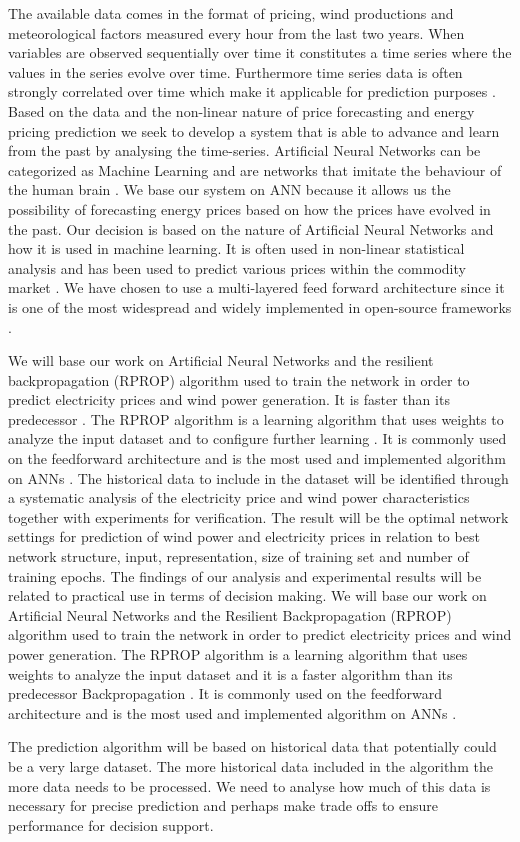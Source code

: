 The available data comes in the format of pricing, wind productions and meteorological factors measured every hour from the last two years. When variables are observed sequentially over time it constitutes a time series where the values in the series evolve over time. Furthermore time series data is often strongly correlated over time which make it applicable for prediction purposes \cite[Chapter~7.1.2]{econometrics}. Based on the data and the non-linear nature of price forecasting and energy pricing prediction we seek to develop a system that is able to advance and learn from the past by analysing the time-series. Artificial Neural Networks can be categorized as Machine Learning \cite{18} and are networks that imitate the behaviour of the human brain \cite{1}. We base our system on ANN because it allows us the possibility of forecasting energy prices based on how the prices have evolved in the past. Our decision is based on the nature of Artificial Neural Networks and how it is used in machine learning. It is often used in non-linear statistical analysis \cite{16} and has been used to predict various prices within the commodity market \cite{2,3,stockForecasting,pjmForecast}. We have chosen to use a multi-layered feed forward architecture since it is one of the most widespread and widely implemented in open-source frameworks \cite{17}.

We will base our work on Artificial Neural Networks and the resilient backpropagation (RPROP) algorithm used to train the network in order to predict electricity prices and wind power generation. It is faster than its predecessor  \cite{8,15}.  The RPROP algorithm is a learning algorithm that uses weights to analyze the input dataset and to configure further learning \cite{17}. It is commonly used on the feedforward architecture and is the most used and implemented algorithm on ANNs \cite{17}. The historical data to include in the dataset will be identified through a systematic analysis of the electricity price and wind power characteristics together with experiments for verification. The result will be the optimal network settings for prediction of wind power and electricity prices in relation to best network structure, input, representation, size of training set and number of training epochs. The findings of our analysis and experimental results will be related to practical use in terms of decision making. We will base our work on Artificial Neural Networks and the Resilient Backpropagation (RPROP) algorithm used to train the network in order to predict electricity prices and wind power generation. The RPROP algorithm is a learning algorithm that uses weights to analyze the input dataset\cite{17} and it is a faster algorithm than its predecessor Backpropagation \cite{8,15}. It is commonly used on the feedforward architecture and is the most used and implemented algorithm on ANNs \cite{17}.

The prediction algorithm will be based on historical data that potentially could be a very large dataset. The more historical data included in the algorithm the more data needs to be processed. We need to analyse how much of this data is necessary for precise prediction and perhaps make trade offs to ensure performance for decision support.